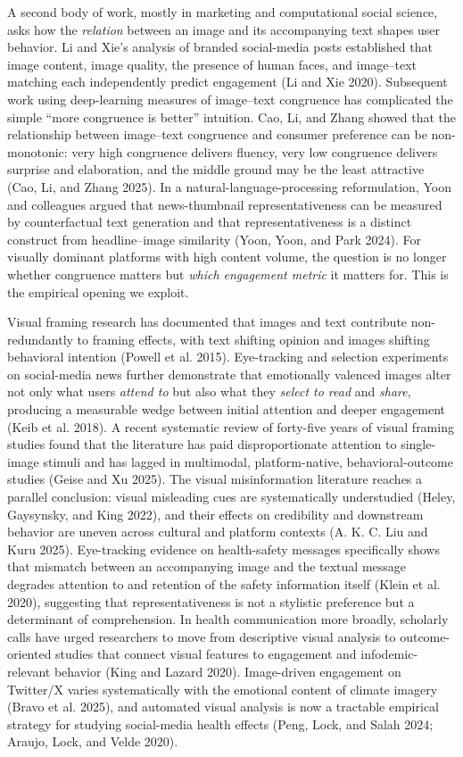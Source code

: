 \documentclass[
  12pt,
]{article}
\begin{document}
A second body of work, mostly in marketing and computational social
science, asks how the \emph{relation} between an image and its
accompanying text shapes user behavior. Li and Xie's analysis of branded
social-media posts established that image content, image quality, the
presence of human faces, and image--text matching each independently
predict engagement (Li and Xie 2020). Subsequent work using
deep-learning measures of image--text congruence has complicated the
simple ``more congruence is better'' intuition. Cao, Li, and Zhang
showed that the relationship between image--text congruence and consumer
preference can be non-monotonic: very high congruence delivers fluency,
very low congruence delivers surprise and elaboration, and the middle
ground may be the least attractive (Cao, Li, and Zhang 2025). In a
natural-language-processing reformulation, Yoon and colleagues argued
that news-thumbnail representativeness can be measured by counterfactual
text generation and that representativeness is a distinct construct from
headline--image similarity (Yoon, Yoon, and Park 2024). For visually
dominant platforms with high content volume, the question is no longer
whether congruence matters but \emph{which engagement metric} it matters
for. This is the empirical opening we exploit.

Visual framing research has documented that images and text contribute
non-redundantly to framing effects, with text shifting opinion and
images shifting behavioral intention (Powell et al. 2015). Eye-tracking
and selection experiments on social-media news further demonstrate that
emotionally valenced images alter not only what users \emph{attend to}
but also what they \emph{select to read} and \emph{share}, producing a
measurable wedge between initial attention and deeper engagement (Keib
et al. 2018). A recent systematic review of forty-five years of visual
framing studies found that the literature has paid disproportionate
attention to single-image stimuli and has lagged in multimodal,
platform-native, behavioral-outcome studies (Geise and Xu 2025). The
visual misinformation literature reaches a parallel conclusion: visual
misleading cues are systematically understudied (Heley, Gaysynsky, and
King 2022), and their effects on credibility and downstream behavior are
uneven across cultural and platform contexts (A. K. C. Liu and Kuru
2025). Eye-tracking evidence on health-safety messages specifically
shows that mismatch between an accompanying image and the textual
message degrades attention to and retention of the safety information
itself (Klein et al. 2020), suggesting that representativeness is not a
stylistic preference but a determinant of comprehension. In health
communication more broadly, scholarly calls have urged researchers to
move from descriptive visual analysis to outcome-oriented studies that
connect visual features to engagement and infodemic-relevant behavior
(King and Lazard 2020). Image-driven engagement on Twitter/X varies
systematically with the emotional content of climate imagery (Bravo et
al. 2025), and automated visual analysis is now a tractable empirical
strategy for studying social-media health effects (Peng, Lock, and Salah
2024; Araujo, Lock, and Velde 2020).
\end{document}
